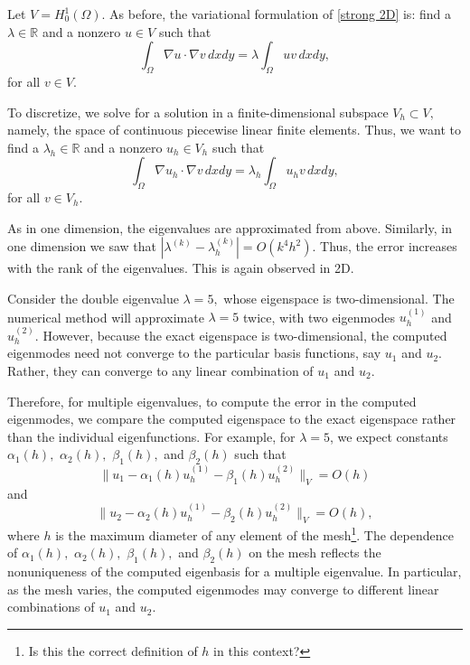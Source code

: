 \documentclass[12pt,a4paper]{article}
\theoremstyle{boldthm}
\theoremstyle{bolddefn}
\begin{document}
Let $V = H_0^1(\Omega).$ As before, the variational formulation of \eqref{strong 2D} is: find a $\lambda \in \mathbb{R}$ and a nonzero $u \in V$ such that
\begin{equation}
\int_{\Omega} \nabla u \cdot \nabla v \, dx dy = \lambda \int_{\Omega} u v \, dxdy,
\end{equation}
for all $v \in V.$


To discretize, we solve for a solution in a finite-dimensional subspace $V_h \subset V,$ namely, the space of continuous piecewise linear finite elements. Thus, we want to find a $\lambda_h \in \mathbb{R}$ and a nonzero $u_h \in V_h$ such that
\begin{equation}
    \int_{\Omega} \nabla u_h \cdot \nabla v \, dx dy = \lambda_h \int_{\Omega} u_h v \, dxdy, 
\end{equation}
for all $v \in V_h.$




As in one dimension, the eigenvalues are approximated from above. Similarly, in one dimension we saw that $| \lambda^{(k)} - \lambda_h^{(k)} | = O(k^4 h^2).$ Thus, the error increases with the rank of the eigenvalues. This is again observed in 2D.

Consider the double eigenvalue $\lambda = 5,$ whose eigenspace is two-dimensional. The numerical method will approximate $\lambda = 5$ twice, with two eigenmodes $u_h^{(1)}$ and $u_h^{(2)}$. However, because the exact eigenspace is two-dimensional, the computed eigenmodes need not converge to the particular basis functions, say $u_1$ and $u_2.$ Rather, they can converge to any linear combination of $u_1$ and $u_2.$ 

Therefore, for multiple eigenvalues, to compute the error in the computed eigenmodes, we compare the computed eigenspace to the exact eigenspace rather than the individual eigenfunctions. For example, for $\lambda = 5$, we expect constants $\alpha_1(h),$ $\alpha_2(h),$ $\beta_1(h),$ and $\beta_2(h)$ such that
\begin{equation}
    \| u_{1} - \alpha_1(h) u_h^{(1)} - \beta_1(h) u_h^{(2)} \|_{V} = O(h)
\end{equation}
and
\begin{equation}
   \| u_{2} - \alpha_2(h) u_h^{(1)} - \beta_2(h) u_h^{(2)} \|_{V} = O(h), 
\end{equation}
where $h$ is the maximum diameter of any element of the mesh\footnote{Is this the correct definition of $h$ in this context?}. The dependence of $\alpha_1(h),$ $\alpha_2(h),$ $\beta_1(h),$ and $\beta_2(h)$ on the mesh 
reflects the nonuniqueness of the computed eigenbasis for a multiple eigenvalue. In particular, as the mesh varies, the computed eigenmodes may converge to different linear combinations of $u_1$ and $u_2.$  
\end{document}
